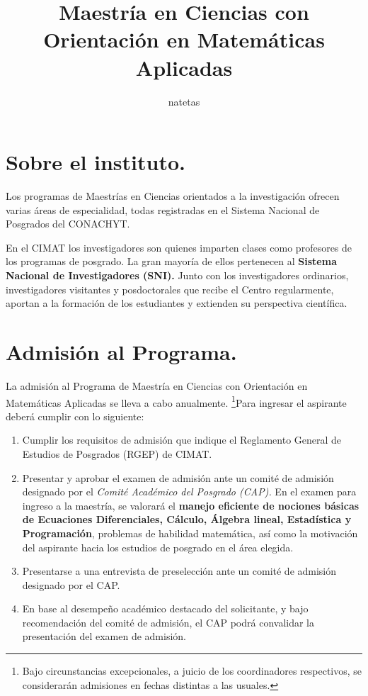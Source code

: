 \documentclass[10pt,a4paper]{article}
\title{Maestría en Ciencias con Orientación en Matemáticas Aplicadas}
\author{natetas}
\date{}
\begin{document}
\maketitle
\newpage
\tableofcontents
\newpage
\section{Sobre el instituto.}
Los programas de Maestrías en Ciencias orientados a la investigación ofrecen varias áreas de especialidad, todas registradas en el Sistema Nacional de Posgrados del CONACHYT.

En el CIMAT los investigadores son quienes imparten clases como profesores de los programas de posgrado. La gran mayoría de ellos pertenecen al \textbf{Sistema Nacional de Investigadores (SNI).} Junto con los investigadores ordinarios, investigadores visitantes y posdoctorales que recibe el Centro regularmente, aportan a la formación de los estudiantes y extienden su perspectiva científica.

\section{Admisión al Programa.}
La admisión al Programa de Maestría en Ciencias con Orientación en Matemáticas Aplicadas se lleva a cabo anualmente. \footnote{Bajo circunstancias excepcionales, a juicio de los coordinadores respectivos, se considerarán admisiones en fechas distintas a las usuales. }Para ingresar el aspirante deberá cumplir con lo siguiente: 

\begin{enumerate}
	\item Cumplir los requisitos de admisión que indique el Reglamento General de Estudios de Posgrados (RGEP) de CIMAT.
	
	\item Presentar y aprobar el examen de admisión ante un comité de admisión designado por el \textit{Comité Académico del Posgrado (CAP).} En el examen para ingreso a la maestría, se valorará el \textbf{manejo eficiente de nociones básicas de Ecuaciones Diferenciales, Cálculo, Álgebra lineal, Estadística y Programación}, problemas de habilidad matemática, así como la motivación del aspirante hacia los estudios de posgrado en el área elegida.
	
	\item Presentarse a una entrevista de preselección ante un comité de admisión designado por el CAP.
	
	\item En base al desempeño académico destacado del solicitante, y bajo recomendación del comité de admisión, el CAP podrá convalidar la presentación del examen de admisión.  
\end{enumerate}
\newpage
\end{document}
